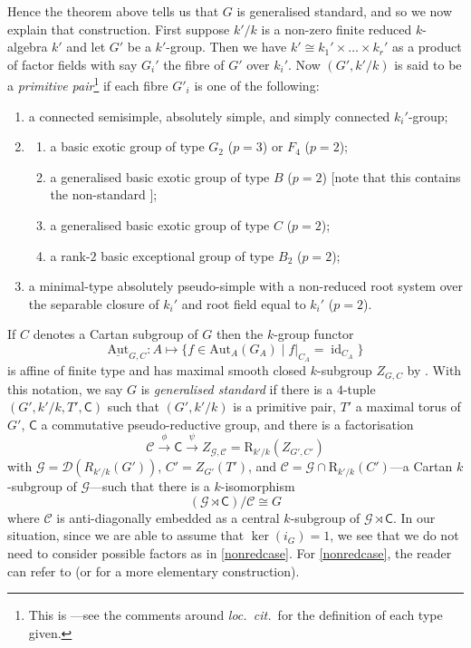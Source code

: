 \documentclass[11pt,reqno]{amsart}
\theoremstyle{definition}
\theoremstyle{remark}
\theoremstyle{definition}
\theoremstyle{plain}
\DeclareMathOperator{\id}{id}
\newcommand{\R}{\mathrm{R}}
\newcommand{\Aut}{\mathrm{Aut}}
\newcommand{\Cs}{\mathsf{C}}
\newcommand{\C}{\mathscr{C}}
\begin{document}
Hence the theorem above tells us that $G$ is generalised standard, and so we now explain that construction. First suppose $k'/k$ is a non-zero finite reduced $k$-algebra $k'$ and let $G'$ be a $k'$-group. Then we have $k'\cong k_1'\times\dots\times k_r'$ as a product of factor fields with say $G_i'$ the fibre of $G'$ over $k_i'$. Now $(G',k'/k)$ is said to be a \emph{primitive pair}\footnote{This is \cite[Defn.~9.1.5]{CPClass}---see the comments around \textit{loc.~cit.~}for the definition of each type given.} if each fibre $G'_i$ is one of the following:
\begin{enumerate}\item a connected semisimple, absolutely simple, and simply connected $k_i'$-group;
  \item 
  \begin{enumerate}
  \item a basic exotic group of type $G_2$ ($p=3$) or $F_4$ ($p=2$);
  \item a generalised basic exotic group of type $B$ ($p=2$) [note that this contains the non-standard ];
  \item a generalised basic exotic group of type $C$ ($p=2$);
  \item a rank-$2$ basic exceptional group of type $B_2$ ($p=2$);
  \end{enumerate}
  \item a minimal-type absolutely pseudo-simple with a non-reduced root
  system over the separable closure of $k_i'$ and root field equal to $k_i'$ ($p=2$).\label{nonredcase}
\end{enumerate}
If $C$ denotes a Cartan subgroup of $G$ then the $k$-group functor $$\underline{\Aut}_{G,C}:A\mapsto \{f\in \Aut_A(G_A)\mid f|_{C_A}=\id_{C_A}\}$$ is affine of finite type and has maximal smooth closed $k$-subgroup $Z_{G,C}$ by \cite[2.4.1]{CGP15}. With this notation, we say $G$ is \emph{generalised standard} if there is a $4$-tuple $(G',k'/k,T',\Cs)$ such that $(G',k'/k)$ is a primitive pair, $T'$ a maximal torus of $G'$, $\Cs$  a commutative pseudo-reductive group, and there is a factorisation 
\begin{equation}\mathscr{C}\stackrel{\phi}{\to} \Cs\stackrel{\psi}{\to}Z_{\mathscr{G},\C}=\R_{k'/k}(Z_{G',C'})\label{fact}\end{equation}
with $\mathscr{G}=\mathscr{D}(R_{k'/k}(G'))$, $C'=Z_{G'}(T')$,  and $\C=\mathscr{G}\cap \R_{k'/k}(C')$---a Cartan $k$-subgroup of $\mathscr{G}$---such that there is a $k$-isomorphism 
\begin{equation}(\mathscr{G}\rtimes \Cs)/\C\cong G\label{gisaquotient}\end{equation}
where $\C$ is anti-diagonally embedded as a central $k$-subgroup of $\mathscr{G}\rtimes \Cs$. 
In our situation, since we are able to assume that $\ker(i_G)=1$, we see that we do not need to consider possible factors as in \cref{nonredcase}. For \cref{nonredcase}, the reader can refer to \cite[Thm.~9.8.6]{CGP15} (or \cite{BRSS24} for a more elementary construction).
\end{document}
